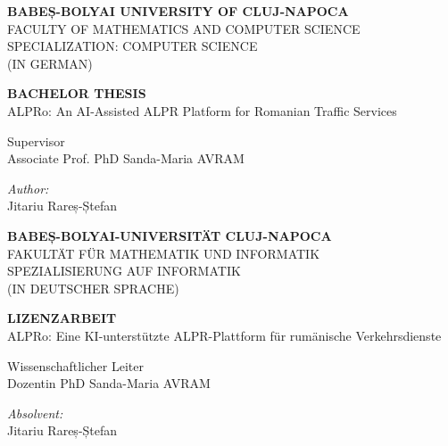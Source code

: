 ﻿\documentclass[12pt,a4paper]{article}
\begin{document}
\begin{titlepage}
\centering

\vspace*{1cm}

{\Large \textbf{BABEȘ-BOLYAI UNIVERSITY OF CLUJ-NAPOCA}}\\[0.2cm]
{\large FACULTY OF MATHEMATICS AND COMPUTER SCIENCE}\\[0.2cm]
{\large SPECIALIZATION: COMPUTER SCIENCE}\\
{\large (IN GERMAN)}\\

\vspace{4cm}

{\LARGE \textbf{BACHELOR THESIS}}\\[1.5cm]
{\Large ALPRo: An AI-Assisted ALPR Platform for Romanian Traffic Services}

\vfill

\begin{flushleft}
Supervisor\\
Associate Prof. PhD Sanda-Maria AVRAM
\end{flushleft}

\begin{flushright}
\textit{Author:}\\
Jitariu Rareș-Ștefan
\end{flushright}

\vspace{1cm}

\end{titlepage}

\begin{titlepage}
\centering

\vspace*{1cm}

{\Large \textbf{BABEȘ-BOLYAI-UNIVERSITÄT CLUJ-NAPOCA}}\\[0.2cm]
{\large FAKULTÄT FÜR MATHEMATIK UND INFORMATIK}\\[0.2cm]
{\large SPEZIALISIERUNG AUF INFORMATIK}\\
{\large (IN DEUTSCHER SPRACHE)}\\

\vspace{4cm}

{\LARGE \textbf{LIZENZARBEIT}}\\[1.5cm]
{\Large ALPRo: Eine KI-unterstützte ALPR-Plattform für rumänische Verkehrsdienste}

\vfill

\begin{flushleft}
Wissenschaftlicher Leiter\\
Dozentin PhD Sanda-Maria AVRAM
\end{flushleft}

\begin{flushright}
\textit{Absolvent:}\\
Jitariu Rareș-Ștefan
\end{flushright}

\vspace{1cm}

\end{titlepage}
\end{document}
